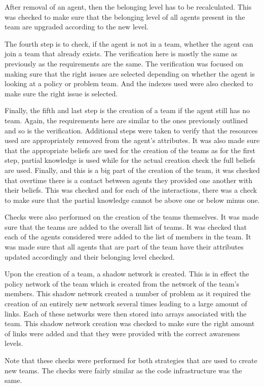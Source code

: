After removal of an agent, then the belonging level has to be recalculated. This was checked to make sure that the belonging level of all agents present in the team are upgraded according to the new level.

The fourth step is to check, if the agent is not in a team, whether the agent can join a team that already exists. The verification here is mostly the same as previously as the requirements are the same. The verification was focused on making sure that the right issues are selected depending on whether the agent is looking at a policy or problem team. And the indexes used were also checked to make sure the right issue is selected.

Finally, the fifth and last step is the creation of a team if the agent still has no team. Again, the requirements here are similar to the ones previously outlined and so is the verification. Additional steps were taken to verify that the resources used are appropriately removed from the agent’s attributes. It was also made sure that the appropriate beliefs are used for the creation of the teams as for the first step, partial knowledge is used while for the actual creation check the full beliefs are used. Finally, and this is a big part of the creation of the team, it was checked that overtime there is a contact between agents they provided one another with their beliefs. This was checked and for each of the interactions, there was a check to make sure that the partial knowledge cannot be above one or below minus one.

Checks were also performed on the creation of the teams themselves. It was made sure that the teams are added to the overall list of teams. It was checked that each of the agents considered were added to the list of members in the team. It was made sure that all agents that are part of the team have their attributes updated accordingly and their belonging level checked.

Upon the creation of a team, a shadow network is created. This is in effect the policy network of the team which is created from the network of the team’s members. This shadow network created a number of problem as it required the creation of an entirely new network several times leading to a large amount of links. Each of these networks were then stored into arrays associated with the team. This shadow network creation was checked to make sure the right amount of links were added and that they were provided with the correct awareness levels.

Note that these checks were performed for both strategies that are used to create new teams. The checks were fairly similar as the code infrastructure was the same.

